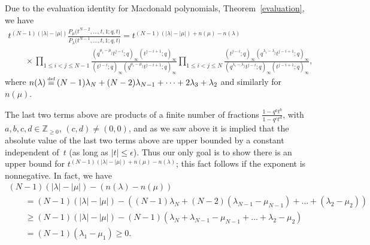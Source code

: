 \documentclass[pdftex]{sigma}
\numberwithin{equation}{section}
\newcommand\myeq{\mathrel{\stackrel{\makebox[0pt]{\mbox{\normalfont\tiny def}}}{=}}}
\newcommand{\Z}{\mathbb{Z}}
\begin{document}
Due to the evaluation identity for Macdonald polynomials, Theorem~\ref{evaluation}, we have
\begin{gather*}
t^{(N-1)(|\lambda| - |\mu|)}\frac{P_{\mu}\big(t^{N-2}, \dots, t, 1; q, t\big)}{P_{\lambda}\big(t^{N-1}, \dots, t, 1; q, t\big)} = t^{(N-1)(|\lambda| - |\mu|) + n(\mu) - n(\lambda)} \\
\qquad{} \times\prod_{1\leq i < j\leq N-1}{\frac{(q^{\mu_i - \mu_j}t^{j-i}; q)_{\infty}(t^{j-i+1}; q)_{\infty}}{(t^{j-i}; q)_{\infty}(q^{\mu_i - \mu_j}t^{j-i+1}; q)_{\infty}}}\prod_{1\leq i < j\leq N}{\frac{(t^{j-i}; q)_{\infty}(q^{\lambda_i - \lambda_j}t^{j-i+1}; q)_{\infty}}{(q^{\lambda_i - \lambda_j}t^{j-i}; q)_{\infty}(t^{j-i+1}; q)_{\infty}}},
\end{gather*}
where $n(\lambda) \myeq (N-1)\lambda_N + (N-2)\lambda_{N-1} + \dots + 2\lambda_3 + \lambda_2$ and similarly for $n(\mu)$.

The last two terms above are products of a f\/inite number of fractions $\frac{1 - q^at^b}{1 - q^ct^d}$, with $a, b, c, d\in\Z_{\geq 0}$, $(c, d)\neq (0, 0)$, and as we saw above it is implied that the absolute value of the last two terms above are upper bounded by a constant independent of~$t$ (as long as $|t| \leq \epsilon$). Thus our only goal is to show there is an upper bound for $t^{(N-1)(|\lambda| - |\mu|) + n(\mu) - n(\lambda)}$; this fact follows if the exponent is nonnegative. In fact, we have
\begin{gather*}
(N - 1)(|\lambda| - |\mu|) - (n(\lambda) - n(\mu)) \\
\qquad{} =(N - 1)(|\lambda| - |\mu|) - ((N - 1)\lambda_N + (N - 2)(\lambda_{N-1} - \mu_{N-1}) + \dots + (\lambda_2 - \mu_2)) \\
\qquad {} \geq (N-1)(|\lambda| - |\mu|) - (N-1)(\lambda_N + \lambda_{N-1} - \mu_{N-1} + \dots + \lambda_2 - \mu_2)\\
\qquad{} = (N - 1)(\lambda_1 - \mu_1)\geq 0.
\end{gather*}
\end{document}
